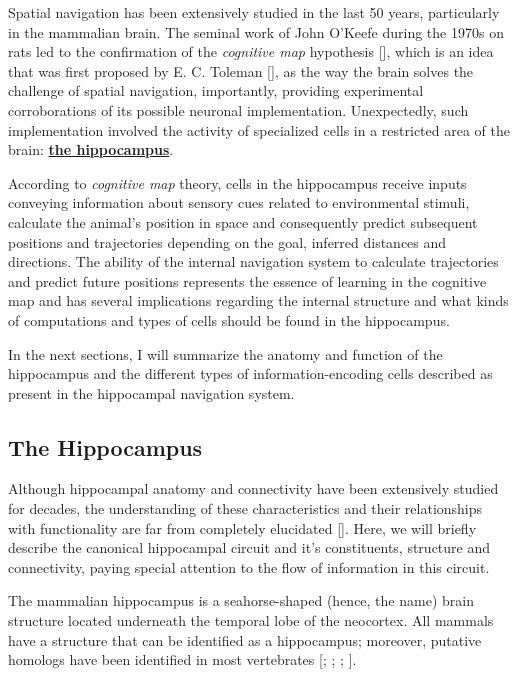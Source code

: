 Spatial navigation has been extensively studied in the last 50 years, particularly in the mammalian brain. 
The seminal work of John O'Keefe during the 1970s on rats led to the confirmation of the \textit{cognitive map} hypothesis [\cite{okeefebook}], which is an idea that was first proposed by E. C. Toleman [\cite{toleman1948}], as the way the brain solves the challenge of spatial navigation, importantly, providing experimental corroborations of its possible neuronal implementation. 
Unexpectedly, such implementation involved the activity of specialized cells in a restricted area of the brain: \hyperref[chap1:sec:1:subsec1:hippocampus]{\textbf{the hippocampus}}.

According to \textit{cognitive map} theory, cells in the hippocampus receive inputs conveying information about sensory cues related to environmental stimuli, calculate the animal's position in space and consequently predict subsequent positions and trajectories depending on the goal, inferred distances and directions. 
The ability of the internal navigation system to calculate trajectories and predict future positions represents the essence of learning in the cognitive map and has several implications regarding the internal structure and what kinds of computations and types of cells should be found in the hippocampus.

In the next sections, I will summarize the anatomy and function of the hippocampus and the different types of information-encoding cells described as present in the hippocampal navigation system.

\subsection{The Hippocampus}
\label{chap1:sec:1:subsec1:hippocampus}
Although hippocampal anatomy and connectivity have been extensively studied for decades, the understanding of these characteristics and their relationships with functionality are far from completely elucidated [\cite{cullen2017}].
Here, we will briefly describe the canonical hippocampal circuit and it's constituents, structure and connectivity, paying special attention to the flow of information in this circuit.

The mammalian hippocampus is a seahorse-shaped (hence, the name) brain structure located underneath the temporal lobe of the neocortex.
All mammals have a structure that can be identified as a hippocampus; moreover, putative homologs have been identified in most vertebrates [\cite{okeefebook}; \cite{kappersandcrosby}; \cite{heier1948}; \cite{crosby1966}].

